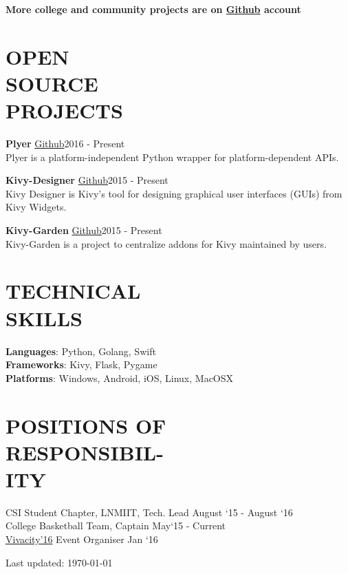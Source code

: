 \documentclass[margin]{res}
\begin{document}
\begin{resume}
{{     \textbf{More college and community projects are on \href{https://github.com/kiok46}{Github} account}

\section{OPEN \\SOURCE \\PROJECTS}

    {\textbf{Plyer} \href{https://github.com/kivy/plyer/pulls/kiok46}{ Github}\hfill 2016 - Present \\
    Plyer is a platform-independent Python wrapper for platform-dependent APIs.

    {\textbf{Kivy-Designer} \href{https://github.com/kivy/kivy-designer/commits?author=kiok46}{ Github}\hfill 2015 - Present \\
    Kivy Designer is Kivy's tool for designing graphical user interfaces (GUIs) from Kivy Widgets.

    {\textbf{Kivy-Garden} \href{https://github.com/kivy-garden/garden.swipetodelete}{ Github}\hfill 2015 - Present \\
    Kivy-Garden is a project to centralize addons for Kivy maintained by users.\
    
\section{TECHNICAL \\ SKILLS} {\textbf{Languages}:} Python, Golang, Swift\\
    {\textbf{Frameworks}:} Kivy, Flask, Pygame\\
    {\textbf{Platforms}:} Windows, Android, iOS, Linux, MacOSX

\section{POSITIONS OF\\ RESPONSIBIL-\\ITY}
    {CSI Student Chapter, LNMIIT,} Tech. Lead \hfill August `15 - August `16\\
    {College Basketball Team,} Captain \hfill  May`15 - Current\\
    \href{http://vivacity.lnmiit.ac.in/events.php}{Vivacity'16} Event Organiser \hfill Jan `16\\
    

\begin{center}
  \begin{footnotesize}
    Last updated: \today \\
  \end{footnotesize}
\end{center}
}
}
}
}
}\end{resume}
\end{document}
